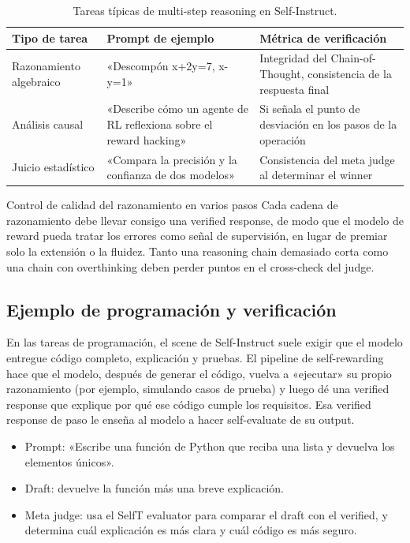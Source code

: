 \documentclass[a4paper]{article}
\begin{document}
\begin{table}[H]
\centering
\begin{tabular}{p{4cm}p{4cm}p{6cm}}
\toprule
Tipo de tarea & Prompt de ejemplo & Métrica de verificación \\
\midrule
Razonamiento algebraico & «Descompón x+2y=7, x-y=1» & Integridad del Chain-of-Thought, consistencia de la respuesta final \\
Análisis causal & «Describe cómo un agente de RL reflexiona sobre el reward hacking» & Si señala el punto de desviación en los pasos de la operación \\
Juicio estadístico & «Compara la precisión y la confianza de dos modelos» & Consistencia del meta judge al determinar el winner \\
\bottomrule
\end{tabular}
\caption{Tareas típicas de multi-step reasoning en Self-Instruct.}
\end{table}

\begin{knowledgebox}{Control de calidad del razonamiento en varios pasos}
Cada cadena de razonamiento debe llevar consigo una verified response, de modo que el modelo de reward pueda tratar los errores como señal de supervisión, en lugar de premiar solo la extensión o la fluidez. Tanto una reasoning chain demasiado corta como una chain con overthinking deben perder puntos en el cross-check del judge.
\end{knowledgebox}

\subsection{Ejemplo de programación y verificación}
En las tareas de programación, el scene de Self-Instruct suele exigir que el modelo entregue código completo, explicación y pruebas. El pipeline de self-rewarding hace que el modelo, después de generar el código, vuelva a «ejecutar» su propio razonamiento (por ejemplo, simulando casos de prueba) y luego dé una verified response que explique por qué ese código cumple los requisitos. Esa verified response de paso le enseña al modelo a hacer self-evaluate de su output.

\begin{itemize}
    \item Prompt: «Escribe una función de Python que reciba una lista y devuelva los elementos únicos».
    \item Draft: devuelve la función más una breve explicación.
    \item Meta judge: usa el SelfT evaluator para comparar el draft con el verified, y determina cuál explicación es más clara y cuál código es más seguro.
\end{itemize}
\end{document}

